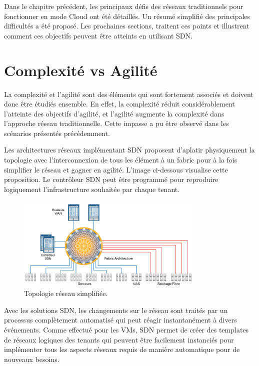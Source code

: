 Dans le chapitre précédent, les principaux défis des réseaux traditionnels pour fonctionner en mode Cloud ont été détaillés. Un résumé simplifié des principales difficultés a été proposé. Les prochaines sections, traitent ces points et illustrent comment ces objectifs peuvent être atteints en utilisant SDN. \cite{realTimeCloudUseCases} 


\section{Complexité vs Agilité}

La complexité et l'agilité sont des éléments qui sont fortement associés et doivent donc être étudiés ensemble. En effet, la complexité réduit considérablement l'atteinte des objectifs d'agilité, et l'agilité augmente la complexité dans l'approche réseau traditionnelle. Cette impasse a pu être observé dans les scénarios présentés précédemment. 

Les architectures réseaux implémentant SDN proposent d'aplatir physiquement la topologie avec l'interconnexion de tous les élément à un \gls{fabric} pour à la fois simplifier le réseau et gagner en agilité. L'image ci-dessous visualise cette proposition. Le contrôleur SDN peut être programmé pour reproduire logiquement l'infrastructure souhaitée par chaque tenant. 

\begin{figure}[h]
\begin{center}
\includegraphics[width=0.8\textwidth]{images/RefArchiSDN_T} 
\caption{Topologie réseau simplifiée. \cite{cloudReadyNetworkJuniper}} \label{RefArchiSDN}
\end{center}
\end{figure} 

Avec les solutions SDN, les changements sur le réseau sont traités par un processus complètement automatisé qui peut réagir instantanément à divers événements. Comme effectué pour les VMs, SDN permet de créer des templates de réseaux logiques des tenants qui peuvent être facilement instanciés pour implémenter tous les aspects réseaux requis de manière automatique pour de nouveaux besoins. 

